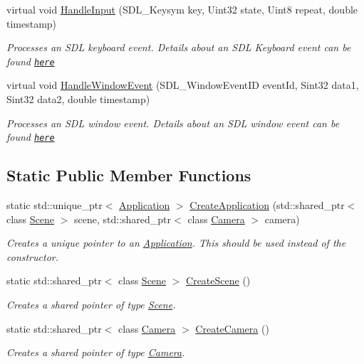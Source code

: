 \begin{DoxyCompactItemize}
virtual void \hyperlink{class_application_afe6553c2828e6eb38f74af8d3a5a9c2f}{Handle\+Input} (S\+D\+L\+\_\+\+Keysym key, Uint32 state, Uint8 repeat, double timestamp)
\begin{DoxyCompactList}\small\item\em Processes an S\+D\+L keyboard event. Details about an S\+D\+L Keyboard event can be found \href{https://wiki.libsdl.org/SDL_KeyboardEvent}{\tt here} \end{DoxyCompactList}\item 
virtual void \hyperlink{class_application_a74d92db64e051efa56d0357989dcb755}{Handle\+Window\+Event} (S\+D\+L\+\_\+\+Window\+Event\+I\+D event\+Id, Sint32 data1, Sint32 data2, double timestamp)
\begin{DoxyCompactList}\small\item\em Processes an S\+D\+L window event. Details about an S\+D\+L window event can be found \href{https://wiki.libsdl.org/SDL_WindowEvent}{\tt here} \end{DoxyCompactList}\end{DoxyCompactItemize}
\subsection*{Static Public Member Functions}
\begin{DoxyCompactItemize}
\item 
static std\+::unique\+\_\+ptr$<$ \hyperlink{class_application}{Application} $>$ \hyperlink{class_application_a727f63f898a68bddf6d88309195ef194}{Create\+Application} (std\+::shared\+\_\+ptr$<$ class \hyperlink{class_scene}{Scene} $>$ scene, std\+::shared\+\_\+ptr$<$ class \hyperlink{class_camera}{Camera} $>$ camera)
\begin{DoxyCompactList}\small\item\em Creates a unique pointer to an \hyperlink{class_application}{Application}. This should be used instead of the constructor. \end{DoxyCompactList}\item 
static std\+::shared\+\_\+ptr$<$ class \hyperlink{class_scene}{Scene} $>$ \hyperlink{class_application_a511e638cf5748e10151f17d6140b9119}{Create\+Scene} ()
\begin{DoxyCompactList}\small\item\em Creates a shared pointer of type \hyperlink{class_scene}{Scene}. \end{DoxyCompactList}\item 
static std\+::shared\+\_\+ptr$<$ class \hyperlink{class_camera}{Camera} $>$ \hyperlink{class_application_a53c0a539fd2c4fe2cc48143cc0a3ea24}{Create\+Camera} ()
\begin{DoxyCompactList}\small\item\em Creates a shared pointer of type \hyperlink{class_camera}{Camera}. \end{DoxyCompactList}\end{DoxyCompactItemize}
